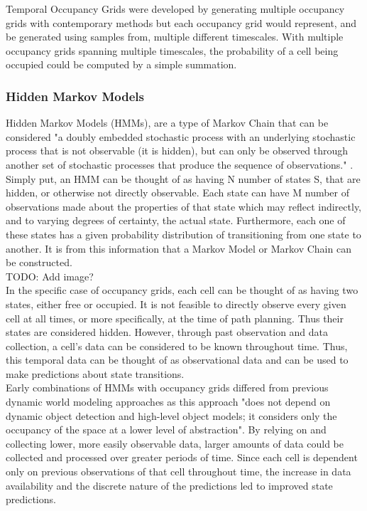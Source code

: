   Temporal Occupancy Grids were developed by generating multiple occupancy
  grids with contemporary methods but each occupancy grid
  would represent, and be generated using samples from, multiple different timescales.
  With multiple occupancy grids spanning multiple timescales, the
  probability of a cell being occupied could be computed by a simple summation.

  \subsubsection{ Hidden Markov Models }

  Hidden Markov Models (HMMs), are a type of Markov Chain that can be considered
  "a doubly embedded stochastic process with an underlying stochastic process
  that is not observable (it is hidden), but can only be observed through
  another set of stochastic processes that produce the sequence of observations."
  \cite{Rabiner1989}. Simply put, an HMM can be thought of as having N
  number of states S, that are hidden, or otherwise not directly observable.
  Each state can have M number of observations made about the properties of that state which
  may reflect indirectly, and to varying degrees of certainty, the actual state.
  Furthermore, each one of these states has a given probability distribution of
  transitioning from one state to another. It is from this information that a
  Markov Model or Markov Chain can be constructed. \\

  TODO: Add image? \\

  In the specific case of occupancy grids, each cell can be thought of as having two
  states, either free or occupied. It is not feasible to directly observe
  every given cell at all times, or more specifically, at the time of path planning.
  Thus their states are considered hidden. However, through past
  observation and data collection, a cell's data can be considered to be known
  throughout time. Thus, this temporal data can be thought of as observational data and
  can be used to make predictions about state transitions. \\

  Early combinations of HMMs with occupancy grids differed from previous dynamic
  world modeling approaches as this approach "does not depend on dynamic object
  detection and high-level object models; it considers only the occupancy of the
  space at a lower level of abstraction"\cite{Meyer-Delius2012}. By relying on
  and collecting lower, more easily observable data, larger amounts of data could
  be collected and processed over greater periods of time. Since each cell is
  dependent only on previous observations of that cell throughout time, the
  increase in data availability and the discrete nature of the predictions led to
  improved state predictions. \\

